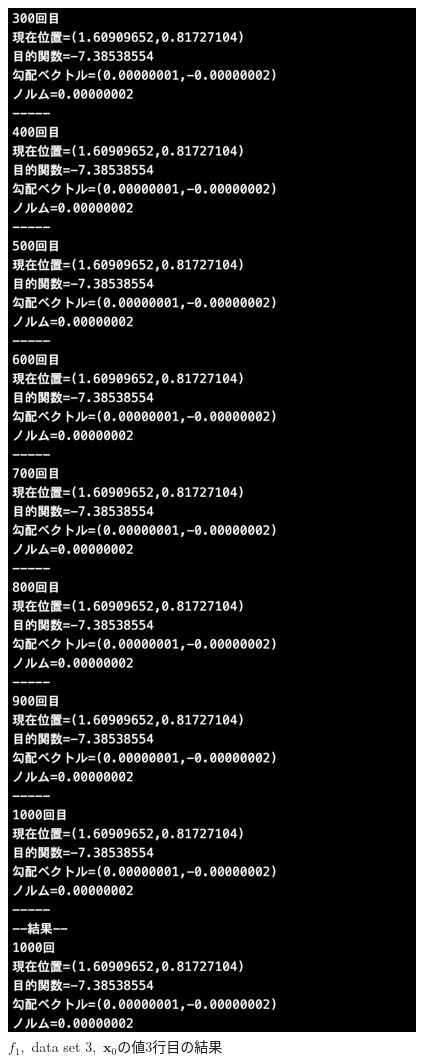 \documentclass[12pt]{jarticle}
\begin{document}
\begin{figure}[h]
\begin{minipage}{0.5\hsize}
        \begin{center}
            \includegraphics[scale=0.2]{kadai1_1s_out3_3_3.png}
        \end{center}
    \end{minipage}
    \caption{$f_1$,\ data set 3,\ $\boldsymbol{x}_0$の値3行目の結果}
\end{figure}
\end{document}
